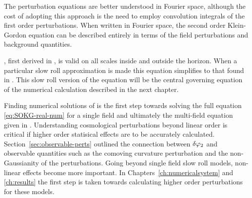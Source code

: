The perturbation equations are better understood in Fourier space, although the cost
of adopting this approach is the need to employ convolution integrals of the first
order
perturbations. When written in Fourier space, the second order Klein-Gordon equation
can
be described entirely in terms of the field perturbations and background quantities. 

, first derived in , is valid on all scales
inside and outside the horizon. When a particular slow roll approximation is made
this equation simplifies to that found in . This slow roll
version of the equation will be the central governing equation of the numerical
calculation described in the next chapter.

Finding numerical solutions of  is the first step towards
solving the full equation \eqref{eq:SOKG-real-num} for a single field and
ultimately the multi-field equation given in . Understanding
cosmological perturbations beyond linear order is critical if higher order statisical
effects are to be accurately calculated. Section~\ref{sec:observable-perts}
outlined the connection between $\delta\varphi_{2}$ and observable quantities such as the
comoving curvature perturbation and the non-Gaussianity of the perturbations. Going
beyond single field slow roll models, non-linear effects become more important. In
Chapters~\ref{ch:numericalsystem} and \ref{ch:results} the first step is taken
towards calculating higher order perturbations for these models.
